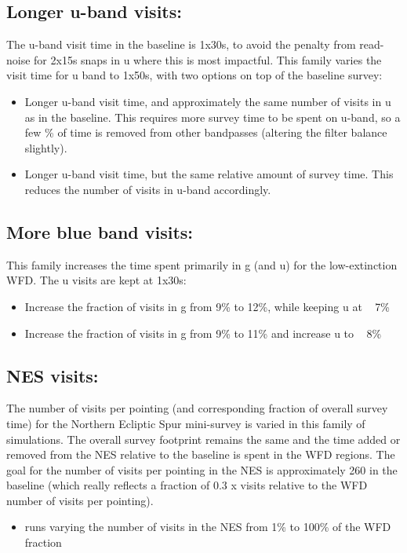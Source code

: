 \subsection{Longer u-band visits:}
The u-band visit time in the baseline is 1x30s, to avoid the penalty from read-noise for 2x15s snaps in u where this is most impactful. This family varies the visit time for u band to 1x50s, with two options on top of the baseline survey: 
\begin{itemize}
\item Longer u-band visit time, and approximately the same number of visits in u as in the baseline. This requires more survey time to be spent on u-band, so a few \% of time is removed from other bandpasses (altering the filter balance slightly). 
\item Longer u-band visit time, but the same relative amount of survey time. This reduces the number of visits in u-band accordingly.
\end{itemize} 

\subsection{More blue band visits:}
This family increases the time spent primarily in g (and u) for the low-extinction WFD. The u visits are kept at 1x30s: 
\begin{itemize}
\item Increase the fraction of visits in g from 9\% to 12\%, while keeping u at ~ 7\%
\item Increase the fraction of visits in g from 9\% to 11\% and increase u to ~ 8\%
\end{itemize}

\subsection{NES visits:}
The number of visits per pointing (and corresponding fraction of overall survey time) for the Northern Ecliptic Spur mini-survey is varied in this family of simulations. The overall survey footprint remains the same and the time added or removed from the NES relative to the baseline is spent in the WFD regions. The goal for the number of visits per pointing in the NES is approximately 260 in the baseline (which really reflects a fraction of 0.3 x visits relative to the WFD number of visits per pointing). 

\begin{itemize}
\item runs varying the number of visits in the NES from 1\% to 100\% of the WFD fraction
\end{itemize}


